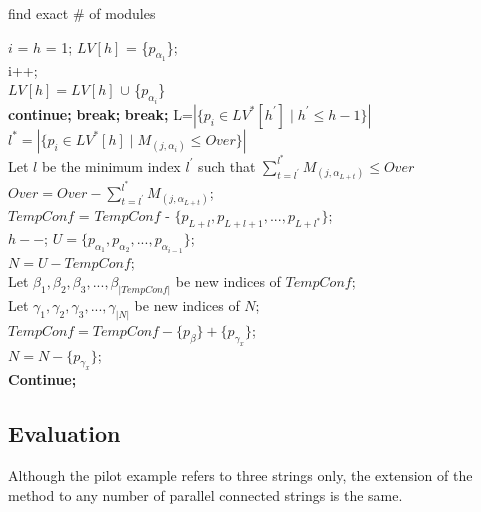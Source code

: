 \documentclass[conference]{IEEEtran}
\begin{document}
\begin{algorithm}
    \caption{find exact \# of modules}
    \LinesNumbered
    $i$ = $h$ = 1; $LV[h]$ = \{$p_{\alpha_1}$\};\\
        {i++;\\
            {$LV[h] = LV[h]$ $\cup$ \{$p_{\alpha_i}$\}\\
            \textup{\textbf{continue;}}}
            {\textup{\textbf{break;}}}
    }
        {
            {\textbf{\textup{break;}}}
        {L=$\left|\{p_i \in LV^*[h^{'}]\mid h^{'} \leq h-1 \}\right|$\\
        $l^{*} = \left|\{p_i \in LV^*[h]\mid M_{(j,\alpha_i)} \leq Over \}\right|$\\
        Let $l$ be the minimum index $l^{'}$ such that $\sum^{l^{*}}_{t=l^{'}}M_{(j,\alpha_{L+t})}\leq Over$\\
        $Over = Over - \sum^{l^{*}}_{t=l^{'}}M_{(j,\alpha_{L+t})}$;\\
        $TempConf$ = $TempConf$ - $\{p_{L+l}, p_{L+l+1},..., p_{L+l^*}\}$;\\
        $h- -$;}
    }
    $U = \{p_{\alpha_{1}}, p_{\alpha_{2}},..., p_{\alpha_{i-1}}\}$;\\
    $N = U-TempConf$;\\
        {Let $\beta_1, \beta_2, \beta_3,...,\beta_{\left|TempConf\right|}$ be new indices of $TempConf$;\\
        Let $\gamma_1, \gamma_2, \gamma_3,...,\gamma_{\left|N\right|}$ be new indices of $N$;\\
            {
                {
                    {$TempConf = TempConf - \{p_{\beta}\}+\{p_{\gamma_x}\}$;\\
            $N = N - \{p_{\gamma_x}\}$;\\
            \textbf{\textup{Continue;}}\\}}}
        }
\end{algorithm}
\subsection{Evaluation}
Although the pilot example refers to three strings only, the extension of the method to any number of parallel connected strings is the same.
\end{document}
